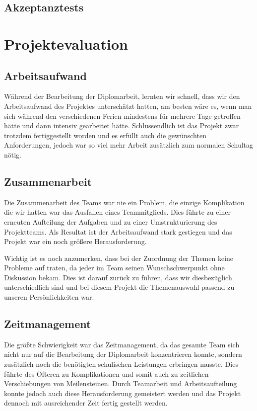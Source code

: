 \section{Akzeptanztests}

\chapter{Projektevaluation}
\section{Arbeitsaufwand}
Während der Bearbeitung der Diplomarbeit, lernten wir schnell, dass wir den Arbeitsaufwand des Projektes unterschätzt hatten, am besten wäre es, wenn man sich während den verschiedenen Ferien mindestens für mehrere Tage getroffen hätte und dann intensiv gearbeitet hätte. Schlussendlich ist das Projekt zwar trotzdem fertiggestellt worden und es erfüllt auch die gewünschten Anforderungen, jedoch war so viel mehr Arbeit zusätzlich zum normalen Schultag nötig. 
\section{Zusammenarbeit}
Die Zusammenarbeit des Teams war nie ein Problem, die einzige Komplikation die wir hatten war das Ausfallen eines Teammitglieds. Dies führte zu einer erneuten Aufteilung der Aufgaben und zu einer Umstrukturierung des Projektteams. Als Resultat ist der Arbeitsaufwand stark gestiegen und das Projekt war ein noch größere Herausforderung. 

Wichtig ist es noch anzumerken, dass bei der Zuordnung der Themen  keine Probleme auf traten, da jeder im Team seinen Wunschschwerpunkt ohne Diskussion bekam. Dies ist darauf zurück zu führen, dass wir diesbezüglich unterschiedlich sind und bei diesem Projekt die Themenauswahl passend zu unseren Persönlichkeiten war.

\section{Zeitmanagement}
Die größte Schwierigkeit war das Zeitmanagement, da das gesamte Team sich nicht nur auf die Bearbeitung der Diplomarbeit konzentrieren konnte, sondern zusätzlich noch die benötigten schulischen Leistungen erbringen musste. Dies führte des Öfteren zu Komplikationen und somit auch zu zeitlichen Verschiebungen von Meilensteinen. Durch Teamarbeit und Arbeitsaufteilung konnte jedoch auch diese Herausforderung gemeistert werden und das Projekt dennoch mit ausreichender Zeit fertig gestellt werden.

